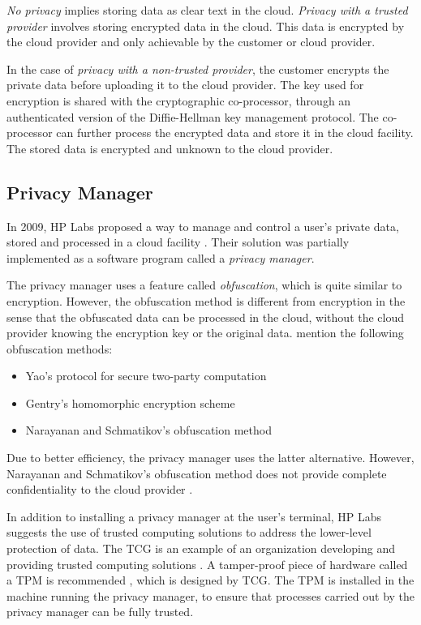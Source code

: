 \documentclass[pdftex,english,10pt,b5paper,twoside]{book}
\begin{document}
\emph{No privacy} implies storing data as clear text in the cloud.
\emph{Privacy with a trusted provider} involves storing encrypted data in the
cloud. This data is encrypted by the cloud provider and only achievable by the
customer or cloud provider.

In the case of \emph{privacy with a non-trusted provider}, the customer
encrypts the private data before uploading it to the cloud provider. The key
used for encryption is shared with the cryptographic co-processor, through an
authenticated version of the Diffie-Hellman key management protocol. The
co-processor can further process the encrypted data and store it in the cloud
facility. The stored data is encrypted and unknown to the cloud provider.

\subsection{Privacy Manager}

In 2009, HP Labs proposed a way to manage and control a user's private data,
stored and processed in a cloud facility \cite{privacymanager}. Their solution
was partially implemented as a software program called a \emph{privacy manager}.

The privacy manager uses a feature called \emph{obfuscation}, which is quite
similar to encryption. However, the obfuscation method is different from
encryption in the sense that the obfuscated data can be processed in the
cloud, without the cloud provider knowing the encryption key or the original
data. \citet{privacymanager} mention the following obfuscation methods:

\begin{itemize}
\item Yao's protocol for secure two-party computation \cite{yao}
\item Gentry's homomorphic encryption scheme \cite{gentry}
\item Narayanan and Schmatikov's obfuscation method \cite{obfuscationmethod}
\end{itemize}

Due to better efficiency, the privacy manager uses the latter alternative. However,
Narayanan and Schmatikov's obfuscation method does not provide complete
confidentiality to the cloud provider \cite{obfuscationmethod}.

In addition to installing a privacy manager at the user's terminal, HP Labs
suggests the use of trusted computing solutions to address the lower-level
protection of data. The \ac{TCG} is an example of an organization developing
and providing trusted computing solutions \cite{tcg}. A tamper-proof piece of
hardware called a \ac{TPM} is recommended \cite{privacymanager}, which is
designed by \ac{TCG}. The \ac{TPM} is installed in the machine running the
privacy manager, to ensure that processes carried out by the privacy manager can
be fully trusted.
\end{document}
